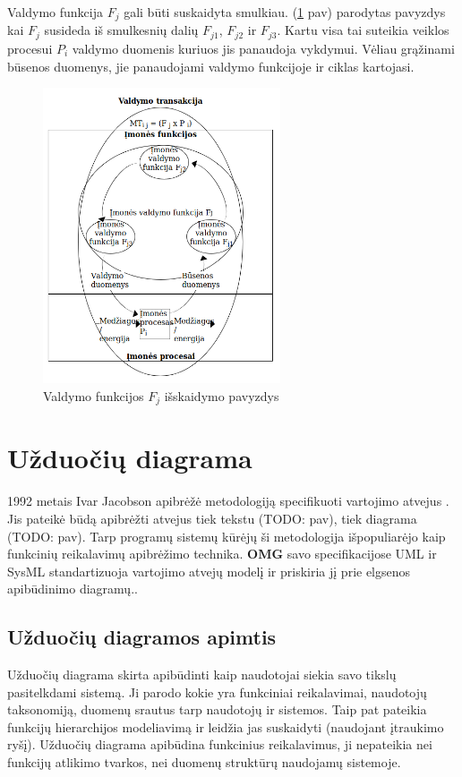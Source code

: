 \documentclass{VUMIFInfBakalaurinis}
\begin{document}
Valdymo funkcija $F_j$ gali būti suskaidyta smulkiau. (\ref{img:splitted_management_function} pav) parodytas pavyzdys kai $F_j$ susideda iš smulkesnių dalių $F_{j1}$, $F_{j2}$ ir $F_{j3}$. Kartu visa tai suteikia veiklos procesui $P_i$ valdymo duomenis kuriuos jis panaudoja vykdymui. Vėliau grąžinami būsenos duomenys, jie panaudojami valdymo funkcijoje ir ciklas kartojasi.

\begin{figure}[H]
	\centering
	\includegraphics[width=7cm]{img/splitted_management_function}
	\caption{Valdymo funkcijos $F_j$ išskaidymo pavyzdys}
	\label{img:splitted_management_function}
\end{figure} 


\section{Užduočių diagrama}

1992 metais Ivar Jacobson apibrėžė metodologiją specifikuoti vartojimo atvejus \cite{Jacobson1992}. Jis pateikė būdą apibrėžti atvejus tiek tekstu (TODO: pav), tiek diagrama (TODO: pav). Tarp programų sistemų kūrėjų ši metodologija išpopuliarėjo kaip funkcinių reikalavimų apibrėžimo technika. \textbf{OMG} savo specifikacijose UML \cite{omgUmlFormal} ir SysML \cite{OMGSysML} standartizuoja vartojimo atvejų modelį ir priskiria jį prie elgsenos apibūdinimo diagramų..

\subsection{Užduočių diagramos apimtis}
Užduočių diagrama skirta apibūdinti kaip naudotojai siekia savo tikslų pasitelkdami sistemą. Ji parodo kokie yra funkciniai reikalavimai, naudotojų taksonomiją, duomenų srautus tarp naudotojų ir sistemos. Taip pat pateikia funkcijų hierarchijos modeliavimą ir leidžia jas suskaidyti (naudojant įtraukimo ryšį). Užduočių diagrama apibūdina funkcinius reikalavimus, ji nepateikia nei funkcijų atlikimo tvarkos, nei duomenų struktūrų naudojamų sistemoje.
\end{document}

